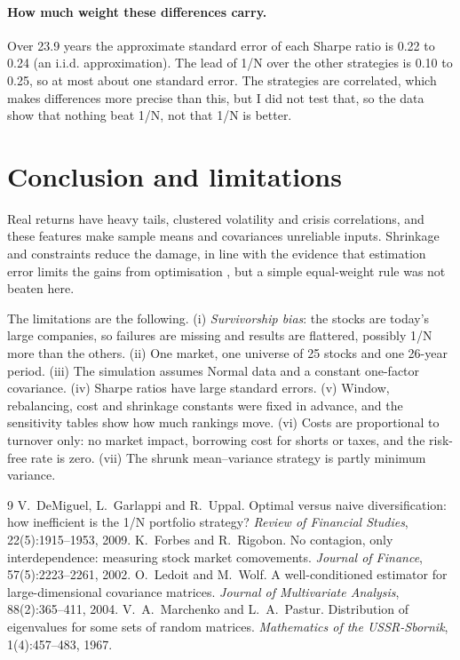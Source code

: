 \documentclass[11pt,a4paper]{article}
\begin{document}
\paragraph{How much weight these differences carry.}
Over 23.9 years the approximate standard error of each Sharpe ratio is 0.22 to 0.24 (an i.i.d.
approximation). The lead of 1/N over the other strategies is 0.10 to 0.25, so at most about one standard
error. The strategies are correlated, which makes differences more precise than this, but I did not test
that, so the data show that nothing beat 1/N, not that 1/N is better.

\section{Conclusion and limitations}
Real returns have heavy tails, clustered volatility and crisis correlations, and these features make
sample means and covariances unreliable inputs. Shrinkage and constraints reduce the damage, in line with
the evidence that estimation error limits the gains from optimisation \cite{demiguel2009}, but a simple
equal-weight rule was not beaten here.

The limitations are the following. (i) \emph{Survivorship bias}: the stocks are today's large companies,
so failures are missing and results are flattered, possibly 1/N more than the others. (ii) One market, one
universe of 25 stocks and one 26-year period. (iii) The simulation assumes Normal data and a constant
one-factor covariance. (iv) Sharpe ratios have large standard errors. (v) Window, rebalancing, cost and
shrinkage constants were fixed in advance, and the sensitivity tables show how much rankings move.
(vi) Costs are proportional to turnover only: no market impact, borrowing cost for shorts or taxes, and
the risk-free rate is zero. (vii) The shrunk mean--variance strategy is partly minimum variance.

\begin{thebibliography}{9}
 V.~DeMiguel, L.~Garlappi and R.~Uppal. Optimal versus naive diversification: how
inefficient is the 1/N portfolio strategy? \emph{Review of Financial Studies}, 22(5):1915--1953, 2009.
 K.~Forbes and R.~Rigobon. No contagion, only interdependence: measuring stock
market comovements. \emph{Journal of Finance}, 57(5):2223--2261, 2002.
 O.~Ledoit and M.~Wolf. A well-conditioned estimator for large-dimensional
covariance matrices. \emph{Journal of Multivariate Analysis}, 88(2):365--411, 2004.
 V.~A.~Marchenko and L.~A.~Pastur. Distribution of eigenvalues for some sets of
random matrices. \emph{Mathematics of the USSR-Sbornik}, 1(4):457--483, 1967.
\end{thebibliography}
\end{document}

